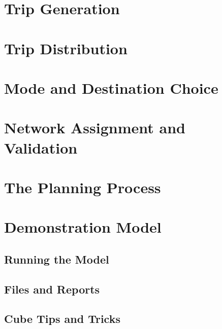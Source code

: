 \documentclass[]{book}
\begin{document}
\hypertarget{chap-tripgen}{%
\chapter{Trip Generation}\label{chap-tripgen}}

\hypertarget{chap-distribution}{%
\chapter{Trip Distribution}\label{chap-distribution}}

\hypertarget{chap-modechoice}{%
\chapter{Mode and Destination Choice}\label{chap-modechoice}}

\hypertarget{chap-assignment}{%
\chapter{Network Assignment and Validation}\label{chap-assignment}}

\hypertarget{chap-process}{%
\chapter{The Planning Process}\label{chap-process}}

\hypertarget{appendix-appendix}{%
\appendix}


\hypertarget{app-demomodel}{%
\chapter{Demonstration Model}\label{app-demomodel}}

\hypertarget{running-the-model}{%
\section{Running the Model}\label{running-the-model}}

\hypertarget{files-and-reports}{%
\section{Files and Reports}\label{files-and-reports}}

\hypertarget{cube-tips-and-tricks}{%
\section{Cube Tips and Tricks}\label{cube-tips-and-tricks}}
\end{document}
